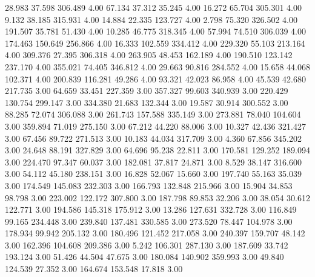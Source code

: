   28.983   37.598  306.489         4.00
  67.134   37.312   35.245         4.00
  16.272   65.704  305.301         4.00
   9.132   38.185  315.931         4.00
  14.884   22.335  123.727         4.00
   2.798   75.320  326.502         4.00
 191.507   35.781   51.430         4.00
  10.285   46.775  318.345         4.00
  57.994   74.510  306.039         4.00
 174.463  150.649  256.866         4.00
  16.333  102.559  334.412         4.00
 229.320   55.103  213.164         4.00
 309.376   27.395  306.318         4.00
 263.905   48.453  162.189         4.00
 190.510  123.142  237.170         4.00
 355.021   74.405  346.812         4.00
  29.663   90.816  284.552         4.00
  15.658   44.068  102.371         4.00
 200.839  116.281   49.286         4.00
  93.321   42.023   86.958         4.00
  45.539   42.680  217.735         3.00
  64.659   33.451  227.359         3.00
 357.327   99.603  340.939         3.00
 220.429  130.754  299.147         3.00
 334.380   21.683  132.344         3.00
  19.587   30.914  300.552         3.00
  88.285   72.074  306.088         3.00
 261.743  157.588  335.149         3.00
 273.881   78.040  104.604         3.00
 359.894   71.019  275.150         3.00
  67.212   44.220   88.006         3.00
  10.327   42.436  321.427         3.00
  67.456   89.722  271.513         3.00
  10.183   44.034  317.709         3.00
   4.360   67.856  345.202         3.00
  24.648   88.191  327.829         3.00
  64.696   95.238   22.811         3.00
 170.581  129.252  189.094         3.00
 224.470   97.347   60.037         3.00
 182.081   37.817   24.871         3.00
   8.529   38.147  316.600         3.00
  54.112   45.180  238.151         3.00
  16.828   52.067   15.660         3.00
 197.740   55.163   35.039         3.00
 174.549  145.083  232.303         3.00
 166.793  132.848  215.966         3.00
  15.904   34.853   98.798         3.00
 223.002  122.172  307.800         3.00
 187.798   89.853   32.206         3.00
  38.054   30.612  122.771         3.00
 194.586  145.318  175.912         3.00
  13.286  127.631  332.728         3.00
 116.849   99.165  234.448         3.00
 239.840  137.481  330.585         3.00
 273.520   78.447  104.978         3.00
 178.934   99.942  205.132         3.00
 180.496  121.452  217.058         3.00
 240.397  159.707   48.142         3.00
 162.396  104.608  209.386         3.00
   5.242  106.301  287.130         3.00
 187.609   33.742  193.124         3.00
  51.426   44.504   47.675         3.00
 180.084  140.902  359.993         3.00
  49.840  124.539   27.352         3.00
 164.674  153.548   17.818         3.00

